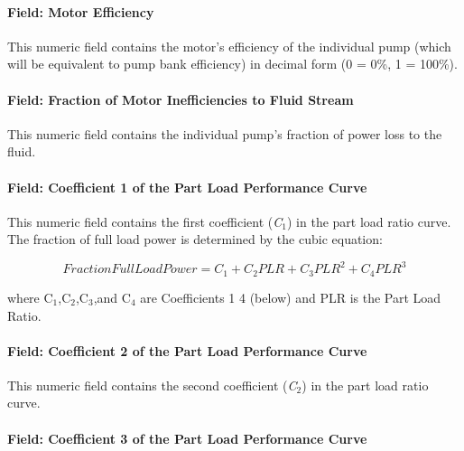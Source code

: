 \paragraph{Field: Motor Efficiency}\label{field-motor-efficiency-4}

This numeric field contains the motor's efficiency of the individual pump (which will be equivalent to pump bank efficiency) in decimal form (0 = 0\%, 1 = 100\%).

\paragraph{Field: Fraction of Motor Inefficiencies to Fluid Stream}\label{field-fraction-of-motor-inefficiencies-to-fluid-stream-4}

This numeric field contains the individual pump's fraction of power loss to the fluid.

\paragraph{Field: Coefficient 1 of the Part Load Performance Curve}\label{field-coefficient-1-of-the-part-load-performance-curve-2}

This numeric field contains the first coefficient (\emph{C\(_{1}\)}) in the part load ratio curve. The fraction of full load power is determined by the cubic equation:

\begin{equation}
FractionFullLoadPower = {C_1} + {C_2}PLR + {C_3}PL{R^2} + {C_4}PL{R^3}
\end{equation}

where C\(_{1}\),C\(_{2}\),C\(_{3}\),and C\(_{4}\) are Coefficients 1 4 (below) and PLR is the Part Load Ratio.

\paragraph{Field: Coefficient 2 of the Part Load Performance Curve}\label{field-coefficient-2-of-the-part-load-performance-curve-2}

This numeric field contains the second coefficient (\emph{C\(_{2}\)}) in the part load ratio curve.

\paragraph{Field: Coefficient 3 of the Part Load Performance Curve}\label{field-coefficient-3-of-the-part-load-performance-curve-2}

